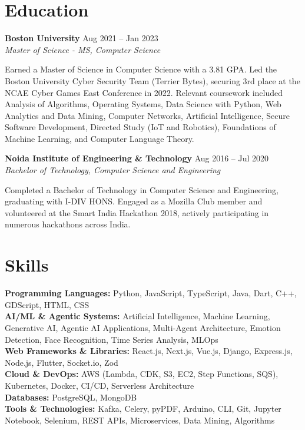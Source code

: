 \documentclass[10pt,a4paper]{article}
\newcommand{\entry}[3]{%
  \textbf{#1} \hfill {\small #3}\\
  {\itshape #2}\par
}
\begin{document}
\section{Education}
\entry{Boston University}{Master of Science - MS, Computer Science}{Aug 2021 -- Jan 2023}
{\small Earned a Master of Science in Computer Science with a 3.81 GPA. Led the Boston University Cyber Security Team (Terrier Bytes), securing 3rd place at the NCAE Cyber Games East Conference in 2022. Relevant coursework included Analysis of Algorithms, Operating Systems, Data Science with Python, Web Analytics and Data Mining, Computer Networks, Artificial Intelligence, Secure Software Development, Directed Study (IoT and Robotics), Foundations of Machine Learning, and Computer Language Theory.}\par
\medskip
\entry{Noida Institute of Engineering \& Technology}{Bachelor of Technology, Computer Science and Engineering}{Aug 2016 -- Jul 2020}
{\small Completed a Bachelor of Technology in Computer Science and Engineering, graduating with I-DIV HONS. Engaged as a Mozilla Club member and volunteered at the Smart India Hackathon 2018, actively participating in numerous hackathons across India.}\par

\section{Skills}
\textbf{Programming Languages:} Python, JavaScript, TypeScript, Java, Dart, C++, GDScript, HTML, CSS\\[2pt]
\textbf{AI/ML \& Agentic Systems:} Artificial Intelligence, Machine Learning, Generative AI, Agentic AI Applications, Multi-Agent Architecture, Emotion Detection, Face Recognition, Time Series Analysis, MLOps\\[2pt]
\textbf{Web Frameworks \& Libraries:} React.js, Next.js, Vue.js, Django, Express.js, Node.js, Flutter, Socket.io, Zod\\[2pt]
\textbf{Cloud \& DevOps:} AWS (Lambda, CDK, S3, EC2, Step Functions, SQS), Kubernetes, Docker, CI/CD, Serverless Architecture\\[2pt]
\textbf{Databases:} PostgreSQL, MongoDB\\[2pt]
\textbf{Tools \& Technologies:} Kafka, Celery, pyPDF, Arduino, CLI, Git, Jupyter Notebook, Selenium, REST APIs, Microservices, Data Mining, Algorithms
\end{document}
